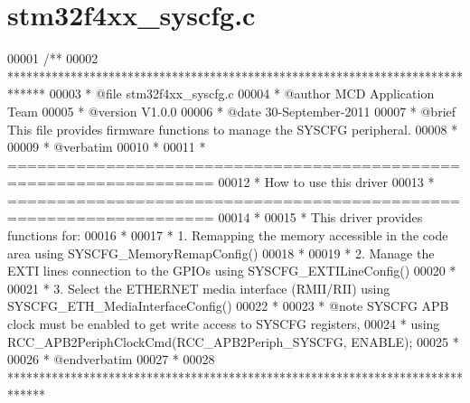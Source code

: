\section{stm32f4xx\+\_\+syscfg.\+c}
\label{stm32f4xx__syscfg_8c_source}

\begin{DoxyCode}
00001 \textcolor{comment}{/**}
00002 \textcolor{comment}{  ******************************************************************************}
00003 \textcolor{comment}{  * @file    stm32f4xx\_syscfg.c}
00004 \textcolor{comment}{  * @author  MCD Application Team}
00005 \textcolor{comment}{  * @version V1.0.0}
00006 \textcolor{comment}{  * @date    30-September-2011}
00007 \textcolor{comment}{  * @brief   This file provides firmware functions to manage the SYSCFG peripheral.}
00008 \textcolor{comment}{  *}
00009 \textcolor{comment}{  *  @verbatim}
00010 \textcolor{comment}{  *  }
00011 \textcolor{comment}{  *          ===================================================================}
00012 \textcolor{comment}{  *                                 How to use this driver}
00013 \textcolor{comment}{  *          ===================================================================}
00014 \textcolor{comment}{  *                  }
00015 \textcolor{comment}{  *          This driver provides functions for:}
00016 \textcolor{comment}{  *          }
00017 \textcolor{comment}{  *          1. Remapping the memory accessible in the code area using SYSCFG\_MemoryRemapConfig()}
00018 \textcolor{comment}{  *              }
00019 \textcolor{comment}{  *          2. Manage the EXTI lines connection to the GPIOs using SYSCFG\_EXTILineConfig()}
00020 \textcolor{comment}{  *            }
00021 \textcolor{comment}{  *          3. Select the ETHERNET media interface (RMII/RII) using SYSCFG\_ETH\_MediaInterfaceConfig()}
00022 \textcolor{comment}{  *}
00023 \textcolor{comment}{  *  @note  SYSCFG APB clock must be enabled to get write access to SYSCFG registers,}
00024 \textcolor{comment}{  *         using RCC\_APB2PeriphClockCmd(RCC\_APB2Periph\_SYSCFG, ENABLE);}
00025 \textcolor{comment}{  *                 }
00026 \textcolor{comment}{  *  @endverbatim}
00027 \textcolor{comment}{  *      }
00028 \textcolor{comment}{  ******************************************************************************}

\end{DoxyCode}
